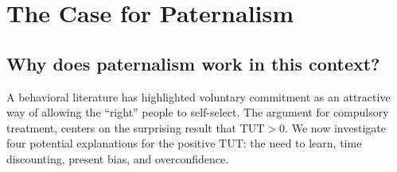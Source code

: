 \documentclass[12pt, a4paper]{article}
\begin{document}



\section{The Case for Paternalism}
\label{Paternalism}

\subsection{Why does paternalism work in this context?}
\label{why_paternalism}

A behavioral literature has highlighted voluntary commitment as an attractive way of allowing the ``right'' people to self-select. %
The argument for compulsory treatment, centers on the surprising result that $\text{TUT}>0$. We now investigate four potential explanations for the positive $\text{TUT}$: the need to learn, time discounting, present bias, and overconfidence.
   
\end{document}
